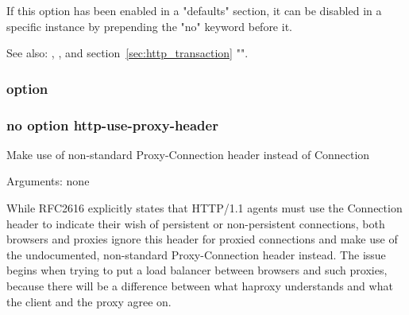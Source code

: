   If this option has been enabled in a "defaults" section, it can be disabled
  in a specific instance by prepending the "no" keyword before it.

  See also: , ,
              and section~\ref{sec:http_transaction} "".

\subsubsection[http-use-proxy-header]{option }
\subsubsection*{no option http-use-proxy-header}


  Make use of non-standard Proxy-Connection header instead of Connection


  Arguments: none

  While RFC2616 explicitly states that HTTP/1.1 agents must use the
  Connection header to indicate their wish of persistent or non-persistent
  connections, both browsers and proxies ignore this header for proxied
  connections and make use of the undocumented, non-standard Proxy-Connection
  header instead. The issue begins when trying to put a load balancer between
  browsers and such proxies, because there will be a difference between what
  haproxy understands and what the client and the proxy agree on.

